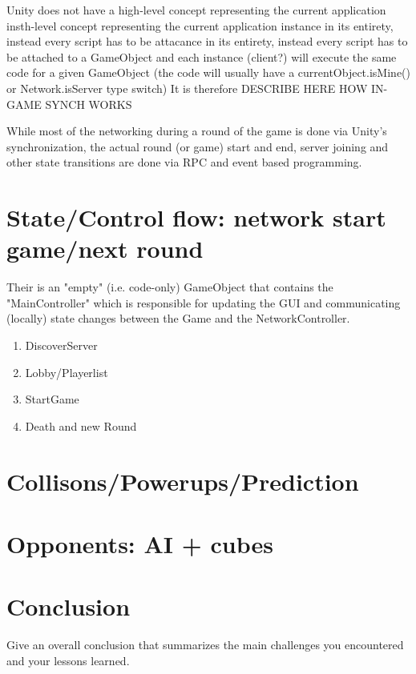 \documentclass{report}
\begin{document}
Unity does not have a high-level concept representing the current application insth-level concept representing the current application instance in its entirety, instead every script has to be attacance in its entirety, instead every script has to be attached to a GameObject and each instance (client?) will execute the same code for a given GameObject (the code will usually have a currentObject.isMine() or Network.isServer type switch)
It is therefore 
DESCRIBE HERE HOW IN-GAME SYNCH WORKS

While most of the networking during a round of the game is done via Unity's synchronization, the actual round (or game) start and end, server joining and other state transitions are done via RPC and event based programming.

\section{State/Control flow: network start game/next round}
Their is an "empty" (i.e. code-only) GameObject that contains the "MainController" which is responsible for updating the GUI and communicating (locally) state changes between the Game and the NetworkController.


\begin{enumerate}
  \item DiscoverServer
  \item Lobby/Playerlist 
  \item StartGame
  \item Death and new Round
\end{enumerate}

\section{Collisons/Powerups/Prediction}

\section{ Opponents: AI + cubes}

\section{Conclusion}

Give an overall conclusion that summarizes the main challenges you encountered and your lessons learned.



\end{document}
